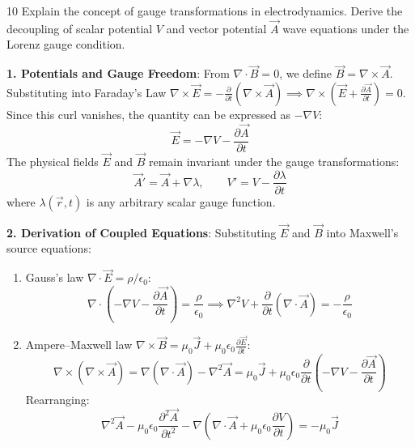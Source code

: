 \begin{theoryq}{10}
Explain the concept of gauge transformations in electrodynamics. Derive the decoupling of scalar potential $V$ and vector potential $\vec{A}$ wave equations under the Lorenz gauge condition.
\end{theoryq}
\begin{theorysol}
\textbf{1. Potentials and Gauge Freedom}:
From $\nabla \cdot \vec{B} = 0$, we define $\vec{B} = \nabla \times \vec{A}$.
Substituting into Faraday's Law $\nabla \times \vec{E} = -\frac{\partial}{\partial t}(\nabla \times \vec{A}) \implies \nabla \times \left(\vec{E} + \frac{\partial \vec{A}}{\partial t}\right) = 0$.
Since this curl vanishes, the quantity can be expressed as $-\nabla V$:
\begin{equation}
\vec{E} = -\nabla V - \frac{\partial \vec{A}}{\partial t}
\end{equation}
The physical fields $\vec{E}$ and $\vec{B}$ remain invariant under the gauge transformations:
\begin{equation}
\vec{A}' = \vec{A} + \nabla \lambda, \qquad V' = V - \frac{\partial \lambda}{\partial t}
\end{equation}
where $\lambda(\vec{r},t)$ is any arbitrary scalar gauge function.

\textbf{2. Derivation of Coupled Equations}:
Substituting $\vec{E}$ and $\vec{B}$ into Maxwell's source equations:
\begin{enumerate}
    \item Gauss's law $\nabla \cdot \vec{E} = \rho/\epsilon_0$:
    \begin{equation}
    \nabla \cdot \left(-\nabla V - \frac{\partial \vec{A}}{\partial t}\right) = \frac{\rho}{\epsilon_0} \implies \nabla^2 V + \frac{\partial}{\partial t}(\nabla \cdot \vec{A}) = -\frac{\rho}{\epsilon_0}
    \end{equation}
    \item Ampere--Maxwell law $\nabla \times \vec{B} = \mu_0 \vec{J} + \mu_0\epsilon_0 \frac{\partial \vec{E}}{\partial t}$:
    \begin{equation}
    \nabla \times (\nabla \times \vec{A}) = \nabla(\nabla \cdot \vec{A}) - \nabla^2 \vec{A} = \mu_0 \vec{J} + \mu_0\epsilon_0 \frac{\partial}{\partial t}\left(-\nabla V - \frac{\partial \vec{A}}{\partial t}\right)
    \end{equation}
    Rearranging:
    \begin{equation}
    \nabla^2 \vec{A} - \mu_0\epsilon_0 \frac{\partial^2 \vec{A}}{\partial t^2} - \nabla\left(\nabla \cdot \vec{A} + \mu_0\epsilon_0 \frac{\partial V}{\partial t}\right) = -\mu_0 \vec{J}
    \end{equation}
\end{enumerate}


\end{theorysol}
